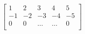 \documentclass[11pt,a4paper,nottitlepage,]{article}
\begin{document}
$$\left[
\begin{array}{ccccc}
1 & 2 & 3 & 4 & 5 \\
-1 & -2 & -3 & -4 & -5 \\
0 & 0 & \ldots & \ldots & 0 \\
\end{array}
\right]
$$
\end{document}
